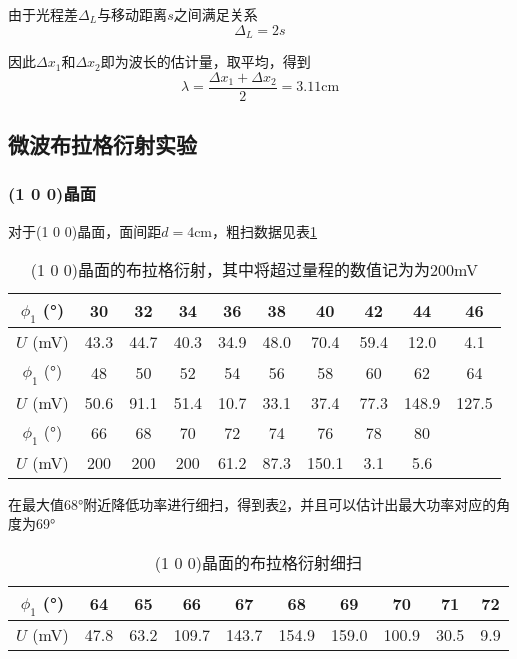 \documentclass[11pt]{article}
\begin{document}
	由于光程差$\Delta_L$与移动距离$s$之间满足关系\[\Delta_L=2s\]
	
	因此$\Delta x_1$和$\Delta x_2$即为波长的估计量，取平均，得到\[\hat{\lambda}=\frac{\Delta x_1+\Delta x_2}{2}=3.11\mathrm{cm}\]
	
	
	
	
	\subsection{微波布拉格衍射实验}
	
	\subsubsection{(1 0 0)晶面}
	对于(1 0 0)晶面，面间距\(d=4\)cm，粗扫数据见表\ref{tab:100}
	
	\begin{table}[h!]
		\centering
		\begin{tabular}{|c|c|c|c|c|c|c|c|c|c|}
			\hline
			$\phi_1$ (°) & 30 & 32 & 34 & 36 & 38 & 40 & 42 & 44 & 46 \\ \hline
			$U$ (mV) & 43.3 & 44.7 & 40.3 & 34.9 & 48.0 & 70.4 & 59.4 & 12.0 & 4.1 \\ \hline
			$\phi_1$ (°) & 48 & 50 & 52 & 54 & 56 & 58 & 60 & 62 & 64 \\ \hline
			$U$ (mV) & 50.6 & 91.1 & 51.4 & 10.7 & 33.1 & 37.4 & 77.3 & 148.9 & 127.5 \\ \hline
			$\phi_1$ (°) & 66 & 68 & 70 & 72 & 74 & 76 & 78 & 80 &  \\ \hline
			$U$ (mV) & 200 & 200 & 200 & 61.2 & 87.3 & 150.1 & 3.1 & 5.6 &  \\ \hline
		\end{tabular}
		\caption{(1 0 0)晶面的布拉格衍射，其中将超过量程的数值记为为200mV}
		\label{tab:100}
	\end{table}
	
	在最大值68°附近降低功率进行细扫，得到表\ref{tab:100'}，并且可以估计出最大功率对应的角度为69°
	
	\begin{table}[h!]
		\centering
		\begin{tabular}{|c|c|c|c|c|c|c|c|c|c|}
			\hline
			$\phi_1$ (°) & 64 & 65 & 66 & 67 & 68 & 69 & 70 & 71 & 72 \\ \hline
			$U$ (mV) & 47.8 & 63.2 & 109.7 & 143.7 & 154.9 & 159.0 & 100.9 & 30.5 & 9.9 \\ \hline
		\end{tabular}
		\caption{(1 0 0)晶面的布拉格衍射细扫}
		\label{tab:100'}
	\end{table}
	
\end{document}
